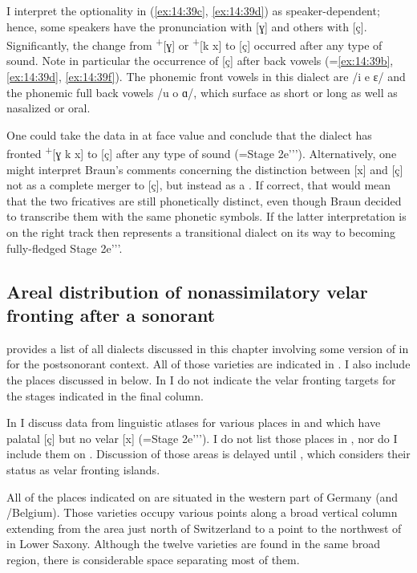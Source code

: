 I interpret the optionality in (\ref{ex:14:39c}, \ref{ex:14:39d}) as speaker-dependent; hence, some speakers have the pronunciation with [ɣ] and others with [ç]. Significantly, the change from  \textsuperscript{+}[ɣ] or \textsuperscript{+}[k x] to [ç] occurred after any type of sound. Note in particular the occurrence of [ç] after back vowels (=\ref{ex:14:39b}, \ref{ex:14:39d}, \ref{ex:14:39f}). The phonemic front vowels in this dialect are /i e ɛ/ and the phonemic full back vowels /u o ɑ/, which surface as short or long as well as nasalized or oral.

One could take the data in  at face value and conclude that the dialect has fronted  \textsuperscript{+}[ɣ k x] to [ç] after any type of sound (=Stage 2e{}'{}'{}'). Alternatively, one might interpret Braun’s comments concerning the distinction between [x] and [ç] not as a complete merger to [ç], but instead as a . If correct, that would mean that the two fricatives are still phonetically distinct, even though Braun decided to transcribe them with the same phonetic symbols. If the latter interpretation is on the right track then  represents a transitional dialect on its way to becoming fully-fledged Stage 2e{}'{}'{}'.

\subsection{Areal distribution of nonassimilatory velar fronting after a sonorant}\label{sec:14.4.3}

 provides a list of all dialects discussed in this chapter involving some version of  in  for the postsonorant context. All of those varieties are indicated in . I also include the places discussed in  below. In  I do not indicate the velar fronting targets for the stages indicated in the final column.

In  I discuss data from linguistic atlases for various places in  and  which have palatal [ç] but no velar [x] (=Stage 2e'{}'{}'). I do not list those places in , nor do I include them on . Discussion of those areas is delayed until , which considers their status as velar fronting islands.

All of the places indicated on  are situated in the western part of Germany (and /Belgium). Those varieties occupy various points along a broad vertical column extending from the area just north of Switzerland to a point to the northwest of  in Lower Saxony. Although the twelve varieties are found in the same broad region, there is considerable space separating most of them.

